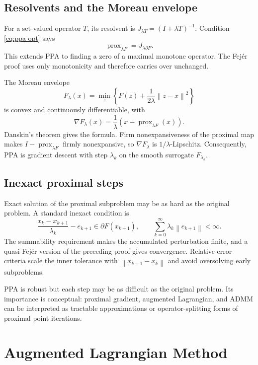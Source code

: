 \documentclass[12pt,oneside]{book}
\numberwithin{equation}{section}
\theoremstyle{definition}
\theoremstyle{plain}
\theoremstyle{remark}
\newcommand{\norm}[1]{\left\lVert #1 \right\rVert}
\begin{document}
\subsection{Resolvents and the Moreau envelope}

For a set-valued operator $T$, its resolvent is
$J_{\lambda T}=(I+\lambda T)^{-1}$. Condition \eqref{eq:ppa-opt} says
\[
 \operatorname{prox}_{\lambda F}=J_{\lambda\partial F}.
\]
This extends PPA to finding a zero of a maximal monotone operator. The Fejér
proof uses only monotonicity and therefore carries over unchanged.

The Moreau envelope
\[
 F_\lambda(x)=\min_z\left\{F(z)+\frac1{2\lambda}\norm{z-x}^2\right\}
\]
is convex and continuously differentiable, with
\begin{equation}\label{eq:moreau-gradient}
 \nabla F_\lambda(x)=\frac1\lambda
 \left(x-\operatorname{prox}_{\lambda F}(x)\right).
\end{equation}
Danskin's theorem gives the formula. Firm nonexpansiveness of the proximal
map makes $I-\operatorname{prox}_{\lambda F}$ firmly nonexpansive, so
$\nabla F_\lambda$ is $1/\lambda$-Lipschitz. Consequently, PPA is gradient
descent with step $\lambda_k$ on the smooth surrogate $F_{\lambda_k}$.

\subsection{Inexact proximal steps}

Exact solution of the proximal subproblem may be as hard as the original
problem. A standard inexact condition is
\[
 \frac{x_k-x_{k+1}}{\lambda_k}-e_{k+1}\in\partial F(x_{k+1}),
 \qquad
 \sum_{k=0}^\infty\lambda_k\norm{e_{k+1}}<\infty.
\]
The summability requirement makes the accumulated perturbation finite, and a
quasi-Fejér version of the preceding proof gives convergence. Relative-error
criteria scale the inner tolerance with $\norm{x_{k+1}-x_k}$ and avoid
oversolving early subproblems.

PPA is robust but each step may be as difficult as the original problem. Its
importance is conceptual: proximal gradient, augmented Lagrangian, and ADMM
can be interpreted as tractable approximations or operator-splitting forms of
proximal point iterations.

\section{Augmented Lagrangian Method}
\end{document}
